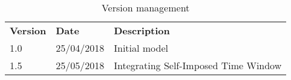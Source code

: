 \begin{table}[!htbp]
    \caption{Version management}
    \begin{tabular}{lll} 
\textbf{Version} & \textbf{Date} & \textbf{Description} \\
1.0 & 25/04/2018 & Initial model \\
1.5 & 25/05/2018 & Integrating Self-Imposed Time Window \\
    \end{tabular}%
\end{table}%